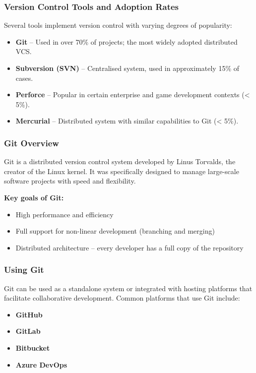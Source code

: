 \documentclass{article}
\begin{document}
\subsubsection{Version Control Tools and Adoption Rates}

Several tools implement version control with varying degrees of popularity:

\begin{itemize}
    \item \textbf{Git} – Used in over 70\% of projects; the most widely adopted distributed VCS.
    \item \textbf{Subversion (SVN)} – Centralised system, used in approximately 15\% of cases.
    \item \textbf{Perforce} – Popular in certain enterprise and game development contexts (< 5\%).
    \item \textbf{Mercurial} – Distributed system with similar capabilities to Git (< 5\%).
\end{itemize}

\subsubsection{Git Overview}

Git is a distributed version control system developed by Linus Torvalds, the creator of the Linux kernel. It was specifically designed to manage large-scale software projects with speed and flexibility.

\vspace{1em}
\noindent\textbf{Key goals of Git:}
\begin{itemize}
    \item High performance and efficiency
    \item Full support for non-linear development (branching and merging)
    \item Distributed architecture – every developer has a full copy of the repository
\end{itemize}

\subsubsection{Using Git}

Git can be used as a standalone system or integrated with hosting platforms that facilitate collaborative development. Common platforms that use Git include:

\begin{itemize}
    \item \textbf{GitHub}
    \item \textbf{GitLab}
    \item \textbf{Bitbucket}
    \item \textbf{Azure DevOps}
\end{itemize}
\end{document}
